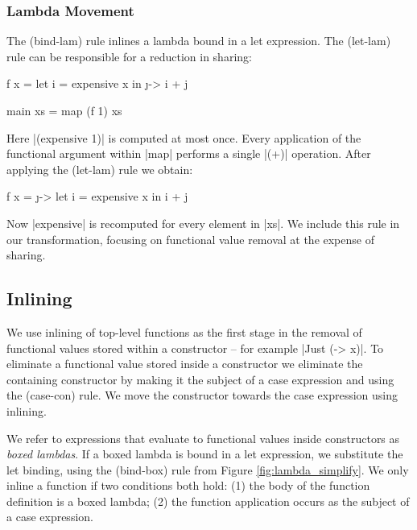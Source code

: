 \documentclass[preprint]{sigplanconf}
\begin{document}
\subsubsection{Lambda Movement}
\label{sec:sharing}

The (bind-lam) rule inlines a lambda bound in a let expression. The (let-lam) rule can be responsible for a reduction in sharing:

\begin{example}
\begin{code}
f x =  let  i = expensive x
       in   \j -> i + j

main xs = map (f 1) xs
\end{code}

\noindent Here |(expensive 1)| is computed at most once. Every application of the functional argument within |map| performs a single |(+)| operation. After applying the (let-lam) rule we obtain:

\begin{code}
f x =  \j ->  let  i = expensive x
              in   i + j
\end{code}

\noindent Now |expensive| is recomputed for every element in |xs|. We include this rule in our transformation, focusing on functional value removal at the expense of sharing.
\end{example}

\subsection{Inlining}
\label{sec:inlining}

We use inlining of top-level functions as the first stage in the removal of functional values stored within a constructor -- for example |Just (\x -> x)|. To eliminate a functional value stored inside a constructor we eliminate the containing constructor by making it the subject of a case expression and using the (case-con) rule. We move the constructor towards the case expression using inlining.

We refer to expressions that evaluate to functional values inside constructors as \textit{boxed lambdas}. If a boxed lambda is bound in a let expression, we substitute the let binding, using the (bind-box) rule from Figure \ref{fig:lambda_simplify}. We only inline a function if two conditions both hold: (1) the body of the function definition is a boxed lambda; (2) the function application occurs as the subject of a case expression.
\end{document}
